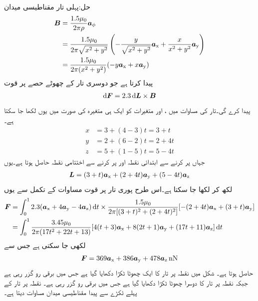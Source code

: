 حل:پہلی تار مقناطیسی میدان 
\begin{align*}
{\ensuremath{{\boldsymbol{B}}}}&=\frac{1.5 \mu_0}{2\pi \rho}{\boldsymbol{a}}_{\phi}\\
&=\frac{1.5\mu_0}{2\pi \sqrt{x^2+y^2}}\left(-\frac{y}{\sqrt{x^2+y^2}}{\boldsymbol{a}}_{\textup{x}}+\frac{x}{x^2+y^2}{\boldsymbol{a}}_{\textup{y}}\right)\\
&=\frac{1.5\mu_0}{2\pi(x^2+y^2)}(-y{\boldsymbol{a}}_{\textup{x}}+x{\boldsymbol{a}}_{\textup{y}})
\end{align*}
پیدا کرتا ہے جو دوسری تار کے چھوٹے حصے  پر قوت
\begin{align}\label{مثال_امالہ_ترچھی_تار}
\dif \kvec{F}=2.3 \dif \kvec{L} \times \kvec{B}
\end{align} 
پیدا کرے گی۔تار کی مساوات  میں ،  اور  متغیرات کو ایک ہی متغیرہ  کی صورت میں یوں لکھا جا سکتا ہے۔
\begin{align*}
x&=3+(4-3)t=3+t\\
y&=2+(6-2)t=2+4t\\
z&=5+(1-5)t=5-4t
\end{align*}
جہاں  پر کرنے سے ابتدائی نقطہ  اور  پر کرنے سے اختتامی نقطہ  حاصل ہوتا ہے۔یوں
\begin{align*}
{\ensuremath{{\boldsymbol{L}}}}=(3+t){\boldsymbol{a}}_{\textup{x}}+(2+4t){\boldsymbol{a}}_{\textup{y}}+(5-4t){\boldsymbol{a}}_{\textup{z}}
\end{align*}
لکھ کر  لکھا جا سکتا ہے۔اس طرح پوری تار پر قوت مساوات  کے تکمل سے یوں 
\begin{align*}
\kvec{F}&=\int_0^1 2.3 ( \ax+4\ay-4 \az)\dif t \times \frac{1.5\mu_0}{2\pi[(3+t)^2+(2+4t)^2]}[-(2+4t)\ax+(3+t)\ay]\\
&=\int_0^1 \frac{3.45\mu_0}{2\pi(17t^2+22t+13)}[4(t+3)\ax+8(2t+1)\ay+(17t+11)\az]\dif t
\end{align*}
لکھی جا سکتی ہے جس سے
\begin{align*}
{\ensuremath{{\boldsymbol{F}}}}=369{\boldsymbol{a}}_{\textup{x}}+386{\boldsymbol{a}}_{\textup{y}}+478{\boldsymbol{a}}_{\textup{z}} \, \si{\nano\newton}
\end{align*}
حاصل ہوتا ہے۔
شکل میں نقطہ  پر تار کا ایک چھوٹا ٹکڑا  دکھایا گیا ہے جس میں  برقی رو گزر رہی ہے  جبکہ نقطہ  پر تار کا دوسرا چھوٹا ٹکڑا  دکھایا گیا ہے جس میں  برقی رو گزر رہی ہے۔ نقطہ  پر تار کے پہلے ٹکڑے سے پیدا مقناطیسی میدان مساوات  دیتا ہے۔

